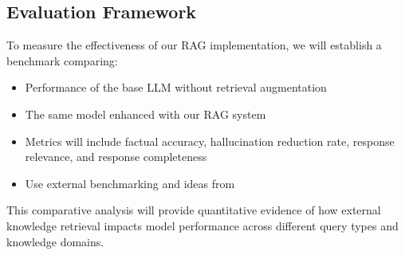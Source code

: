 \documentclass[fleqn,moreauthors,10pt]{ds_report}
\begin{document}
\subsection*{Evaluation Framework}
To measure the effectiveness of our RAG implementation, we will establish a benchmark comparing:

\begin{itemize}
\item Performance of the base LLM without retrieval augmentation
\item The same model enhanced with our RAG system
\item Metrics will include factual accuracy, hallucination reduction rate, response relevance, and response completeness
\item Use external benchmarking and ideas from \cite{chen} 
\end{itemize}

This comparative analysis will provide quantitative evidence of how external knowledge retrieval impacts model performance across different query types and knowledge domains.




\end{document}
